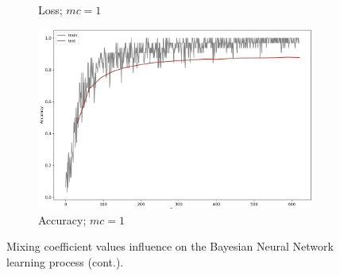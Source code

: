 \begin{figure}[]
\begin{subfigure}[b]{0.48\textwidth}
         \caption{Loss; $mc=1$}
     \end{subfigure}
     \hfill
     \begin{subfigure}[b]{0.48\textwidth}
         \centering
         \includegraphics[width=\textwidth]{observational/img/bnn/mc/AC_mc1.png}
         \caption{Accuracy; $mc=1$}
     \end{subfigure} 
     \caption[]{Mixing coefficient values influence on the Bayesian Neural Network learning process (cont.).}
\end{figure}